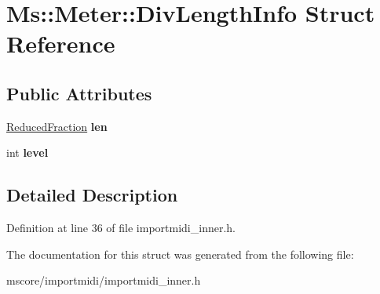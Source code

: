 \hypertarget{struct_ms_1_1_meter_1_1_div_length_info}{}\section{Ms\+:\+:Meter\+:\+:Div\+Length\+Info Struct Reference}
\label{struct_ms_1_1_meter_1_1_div_length_info}
\subsection*{Public Attributes}
\begin{DoxyCompactItemize}
\item 
\mbox{\label{struct_ms_1_1_meter_1_1_div_length_info_af9d998d828b14bcc246f8f645cff5ace}} 
\hyperlink{class_ms_1_1_reduced_fraction}{Reduced\+Fraction} {\bfseries len}
\item 
\mbox{\label{struct_ms_1_1_meter_1_1_div_length_info_a1673c49b0a4a094b6cc0757140048b60}} 
int {\bfseries level}
\end{DoxyCompactItemize}


\subsection{Detailed Description}


Definition at line 36 of file importmidi\+\_\+inner.\+h.



The documentation for this struct was generated from the following file\+:\begin{DoxyCompactItemize}
\item 
mscore/importmidi/importmidi\+\_\+inner.\+h\end{DoxyCompactItemize}
